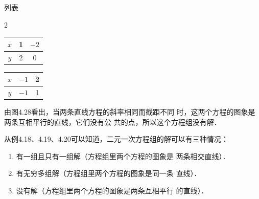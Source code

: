 \begin{solution}
    列表
    \begin{multicols}{2}
       \begin{center}
           \begin{tabular}{c|cc}
              \hline
               $x$&1&$-2$\\
               \hline
               $y$&2&0\\
               \hline
           \end{tabular}
       \end{center}
       \begin{center}
           \begin{tabular}{c|cc}
               \hline
               $x$&$-1$&2\\
               \hline
               $y$&$-1$&1\\
               \hline
           \end{tabular}
       \end{center}
   \end{multicols}
   \begin{figure}[htp]
    \centering
{}
    \caption{}
\end{figure}

由图4.28看出，当两条直线方程的斜率相同而截距不同
时，这两个方程的图象是两条互相平行的直线，它们没有公
共的点，所以这个方程组没有解．
\end{solution}


从例4.18、4.19、4.20可以知道，二元一次方程组的解可以有三种情况：
\begin{enumerate}
   \item 有一组且只有一组解（方程组里两个方程的图象是
两条相交直线）．
\item 有无穷多组解（方程组里两个方程的图象是同一条
直线）．
\item 没有解（方程组里两个方程的图象是两条互相平行
的直线）． 
\end{enumerate}

